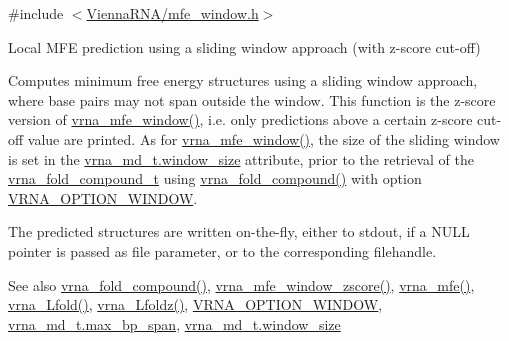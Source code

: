 {\ttfamily \#include $<$\hyperlink{mfe__window_8h}{Vienna\+R\+N\+A/mfe\+\_\+window.\+h}$>$}



Local M\+FE prediction using a sliding window approach (with z-\/score cut-\/off) 

Computes minimum free energy structures using a sliding window approach, where base pairs may not span outside the window. This function is the z-\/score version of \hyperlink{group__mfe__window_ga689df235a1915a1ad56e377383c044ce}{vrna\+\_\+mfe\+\_\+window()}, i.\+e. only predictions above a certain z-\/score cut-\/off value are printed. As for \hyperlink{group__mfe__window_ga689df235a1915a1ad56e377383c044ce}{vrna\+\_\+mfe\+\_\+window()}, the size of the sliding window is set in the \hyperlink{group__model__details_abea42f9229f8d8d6bcbedef316315bfc}{vrna\+\_\+md\+\_\+t.\+window\+\_\+size} attribute, prior to the retrieval of the \hyperlink{group__fold__compound_ga1b0cef17fd40466cef5968eaeeff6166}{vrna\+\_\+fold\+\_\+compound\+\_\+t} using \hyperlink{group__fold__compound_ga6601d994ba32b11511b36f68b08403be}{vrna\+\_\+fold\+\_\+compound()} with option \hyperlink{group__fold__compound_ga2b2a8009ccdccc3eb1571556261aee8e}{V\+R\+N\+A\+\_\+\+O\+P\+T\+I\+O\+N\+\_\+\+W\+I\+N\+D\+OW}.

The predicted structures are written on-\/the-\/fly, either to stdout, if a N\+U\+LL pointer is passed as file parameter, or to the corresponding filehandle.

\begin{DoxySeeAlso}{See also}
\hyperlink{group__fold__compound_ga6601d994ba32b11511b36f68b08403be}{vrna\+\_\+fold\+\_\+compound()}, \hyperlink{group__mfe__window_gaa4f67ae94efd08d800c17f9b53423fd6}{vrna\+\_\+mfe\+\_\+window\+\_\+zscore()}, \hyperlink{group__mfe__global_gabd3b147371ccf25c577f88bbbaf159fd}{vrna\+\_\+mfe()}, \hyperlink{group__mfe__window_ga4918cce52bf69c1913cda503b2ac75d8}{vrna\+\_\+\+Lfold()}, \hyperlink{group__mfe__window_ga27fddda5fc63eb49c861e38845fc34b4}{vrna\+\_\+\+Lfoldz()}, \hyperlink{group__fold__compound_ga2b2a8009ccdccc3eb1571556261aee8e}{V\+R\+N\+A\+\_\+\+O\+P\+T\+I\+O\+N\+\_\+\+W\+I\+N\+D\+OW}, \hyperlink{group__model__details_a659e5fcc6e8c9f1a68e7de6548eef3b0}{vrna\+\_\+md\+\_\+t.\+max\+\_\+bp\+\_\+span}, \hyperlink{group__model__details_abea42f9229f8d8d6bcbedef316315bfc}{vrna\+\_\+md\+\_\+t.\+window\+\_\+size}
\end{DoxySeeAlso}

